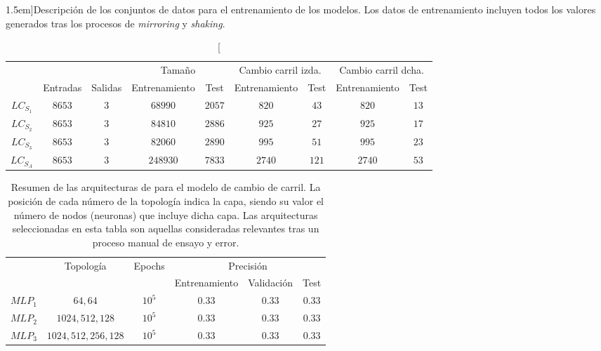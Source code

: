 \begin{table*}[t]
	\centering
	\caption[Descripción de los conjuntos de datos][1.5em]{Descripción de los conjuntos de datos para el entrenamiento de los modelos. Los datos de entrenamiento incluyen todos los valores generados tras los procesos de \textit{mirroring} y \textit{shaking}.}
	\label{tbl:lc-datasets-description}
	\begin{tabular}{ccccccccc}
		\toprule
		&          &         & \multicolumn{2}{c}{Tamaño}  & \multicolumn{2}{c}{Cambio carril izda.}  & \multicolumn{2}{c}{Cambio carril dcha.}  \\
		& Entradas & Salidas & Entrenamiento & Test & Entrenamiento & Test & Entrenamiento & Test \\
		\midrule
		\rowcolor{black!20} $LC_{S_1}$ & $8653$ & $3$ & $68990$  & $2057$ & $820$  & $43$  & $820$  & $13$  \\
		$LC_{S_2}$ & $8653$ & $3$ & $84810$  & $2886$ & $925$  & $27$ & $925$  & $17$  \\
		\rowcolor{black!20} $LC_{S_3}$ & $8653$ & $3$ & $82060$  & $2890$ & $995$  & $51$  & $995$  & $23$ \\
		$LC_{S_A}$ & $8653$ & $3$ & $248930$ & $7833$ & $2740$ & $121$ & $2740$ & $53$ \\
		\bottomrule
	\end{tabular}
\end{table*}

\begin{table}
	\centering
	\small
	\caption[Resumen de las arquitecturas \acrshort{mlp} para el modelo de cambio de carril]{Resumen de las arquitecturas de  para el modelo de cambio de carril. La posición de cada número de la topología indica la capa, siendo su valor el número de nodos (neuronas) que incluye dicha capa. Las arquitecturas seleccionadas en esta tabla son aquellas consideradas relevantes tras un proceso manual de ensayo y error.}
	\label{tbl:lc-mlp-architectures}
	\begin{tabular}{cccccc}
		\toprule
		\multirow{2}{*}{} & \multirow{2}{*}{Topología} & \multirow{2}{*}{Epochs} & \multicolumn{3}{c}{Precisión} \\
		& & & Entrenamiento & Validación & Test \\
		\midrule
		\rowcolor{black!20} $MLP_1$ & $64, 64$ & $10^5$ & $0.33$ & $0.33$ & $0.33$ \\
		$MLP_2$ & $1024, 512, 128$  & $10^5$ & $0.33$ & $0.33$ & $0.33$ \\
		\rowcolor{black!20} $MLP_3$ & $1024, 512, 256, 128$ & $10^5$ & $0.33$ & $0.33$ & $0.33$ \\
		\bottomrule
	\end{tabular}
\end{table}

